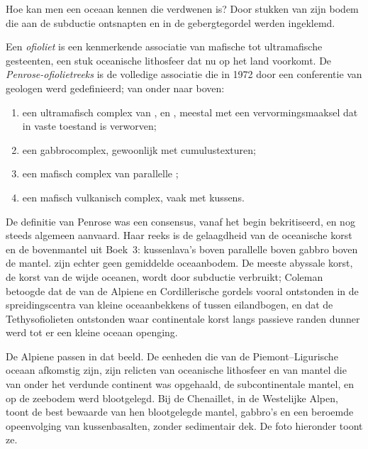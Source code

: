 Hoe kan men een oceaan kennen die verdwenen is? Door stukken van zijn bodem die aan de
subductie ontsnapten en in de gebergtegordel werden ingeklemd.

\begin{definition}\label{def:b2:alpine-orogen:ophiolite}
Een \emph{ofioliet} is een kenmerkende associatie van mafische tot ultramafische
gesteenten, een stuk oceanische lithosfeer dat nu op het land voorkomt. De
\emph{Penrose-ofiolietreeks} is de volledige associatie die in 1972 door een
conferentie van geologen werd gedefinieerd; van onder naar boven:
\begin{enumerate}
\item een ultramafisch complex van ,  en , meestal met een
vervormingsmaaksel dat in vaste toestand is verworven;
\item een gabbrocomplex, gewoonlijk met cumulustexturen;
\item een mafisch complex van parallelle ;
\item een mafisch vulkanisch complex, vaak met kussens.
\end{enumerate}
\end{definition}

De definitie van Penrose was een consensus, vanaf het begin bekritiseerd, en nog steeds algemeen
aanvaard. Haar reeks is de gelaagdheid van de oceanische korst en de bovenmantel uit
Boek~3: kussenlava's boven parallelle  boven gabbro boven de mantel.  zijn echter geen
gemiddelde oceaanbodem. De meeste abyssale korst, de korst van de wijde oceanen, wordt door
subductie verbruikt; Coleman betoogde dat de  van de Alpiene en Cordillerische gordels
vooral ontstonden in de spreidingscentra van kleine oceaanbekkens of tussen eilandbogen, en dat de
Tethysofiolieten ontstonden waar continentale korst langs passieve randen dunner werd tot er een kleine
oceaan openging.

De Alpiene  passen in dat beeld. De eenheden die van de Piemont--Ligurische oceaan afkomstig zijn,
zijn relicten van oceanische lithosfeer en van mantel die van onder het
verdunde continent was opgehaald, de subcontinentale mantel, en op de zeebodem werd blootgelegd. Bij de
Chenaillet, in de Westelijke Alpen, toont de best bewaarde van hen blootgelegde
mantel, gabbro's en een beroemde opeenvolging van kussenbasalten, zonder sedimentair dek.
De foto hieronder toont ze.

